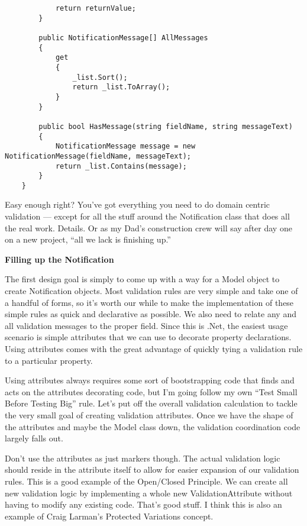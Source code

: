 \documentclass{article}
\begin{document}
{\begin{lstlisting}
            return returnValue;
        }

        public NotificationMessage[] AllMessages
        {
            get
            {
                _list.Sort();
                return _list.ToArray();
            }
        } 

        public bool HasMessage(string fieldName, string messageText)
        {
            NotificationMessage message = new NotificationMessage(fieldName, messageText);
            return _list.Contains(message);
        }
    }
\end{lstlisting}	

Easy enough right?  You've got everything you need to do domain centric validation — except for all the stuff around the Notification class that does all the real work.  Details.  Or as my Dad's construction crew will say after day one on a new project, “all we lack is finishing up.”

 
\Large {\textbf{Filling up the Notification}}

The first design goal is simply to come up with a way for a Model object to create Notification objects.  Most validation rules are very simple and take one of a handful of forms, so it's worth our while to make the implementation of these simple rules as quick and declarative as possible.  We also need to relate any and all validation messages to the proper field.  Since this is .Net, the easiest usage scenario is simple attributes that we can use to decorate property declarations.  Using attributes comes with the great advantage of quickly tying a validation rule to a particular property.

Using attributes always requires some sort of bootstrapping code that finds and acts on the attributes decorating code, but I'm going follow my own “Test Small Before Testing Big” rule.  Let's put off the overall validation calculation to tackle the very small goal of creating validation attributes.  Once we have the shape of the attributes and maybe the Model class down, the validation coordination code largely falls out.

Don't use the attributes as just markers though.  The actual validation logic should reside in the attribute itself to allow for easier expansion of our validation rules.  This is a good example of the Open/Closed Principle.  We can create all new validation logic by implementing a whole new ValidationAttribute without having to modify any existing code.  That's good stuff.  I think this is also an example of Craig Larman's Protected Variations concept.

}
\end{document}
